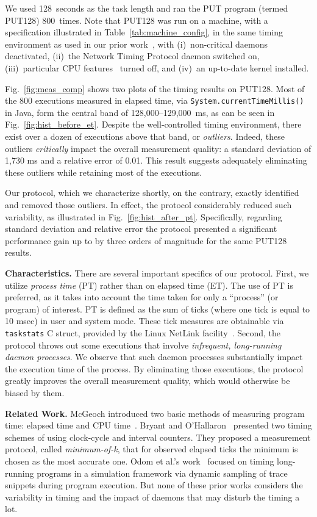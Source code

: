 \documentclass[letter]{ieice}
\begin{document}
We used 128~seconds as the task length and ran the PUT program (termed PUT128) 
800~times. 
Note that PUT128 was run on a machine, with 
a specification illustrated in Table~\ref{tab:machine_config}, 
in the same timing environment as used in our prior work~\cite{Currim}, 
with (i)~non-critical daemons deactivated, 
(ii)~the Network Timing Protocol daemon switched on,  
(iii)~particular CPU features~\cite{intel15,intelSpeed15} turned off, 
and (iv)~an up-to-date kernel installed.

Fig.~\ref{fig:meas_comp} shows two plots of the timing results on PUT128.
Most of the 800 executions measured in elapsed time, 
via  {\tt System.currentTimeMillis()} in Java, form the central band 
of \hbox{128,000--129,000 ms,} as can be seen in Fig.~\ref{fig:hist_before_et}. 
Despite the well-controlled timing environment, there exist over a dozen of executions above that band, or {\em outliers}. Indeed, these outliers {\em critically} impact the overall measurement quality: a standard deviation of 1,730 ms and a relative error of 0.01. This result suggests adequately eliminating these outliers while retaining most of the executions.

Our protocol, which we characterize shortly, on the contrary, 
exactly identified and removed those outliers. 
In effect, the protocol considerably reduced such variability, 
as illustrated in Fig.~\ref{fig:hist_after_pt}. 
Specifically, regarding standard deviation and relative error 
the protocol presented a significant performance gain up to by 
three orders of magnitude for the same PUT128 results.

{\bf Characteristics.} There are several important specifics of our protocol. 
First, we utilize {\em process time} (PT) rather than on elapsed time (ET). 
The use of PT is preferred, as it takes into account 
the time taken for only a ``process'' (or program) of interest.
PT is defined as the sum of ticks (where one tick is equal to 10 msec)
in user and system mode. 
These tick measures are obtainable via {\tt taskstats} C struct, 
provided by the Linux NetLink facility~\cite{Netlink}. 
Second, the protocol throws out some executions that involve
{\em infrequent, \hbox{long-running} daemon processes}. 
We observe that such daemon processes substantially impact 
the execution time of the process.  
By eliminating those executions, the protocol greatly improves
the overall measurement quality, which would otherwise be biased by them.

{\bf Related Work.} 
McGeoch introduced
two basic methods of measuring program time: elapsed time and CPU time~\cite{Mcgeoch12}. 
Bryant and O'Hallaron~\cite{Randal03} 
presented two timing schemes of using clock-cycle and interval counters. 
They proposed a measurement protocol, called {\em minimum-of-k}, 
that for observed elapsed ticks the minimum is chosen as the most accurate one. 
Odom et al.'s work~\cite{Odom05} focused on timing long-running programs 
in a simulation framework via dynamic sampling of trace snippets during program execution. 
But none of these prior works considers the variability in 
timing and the impact of daemons that may disturb the timing a lot.
\end{document}
